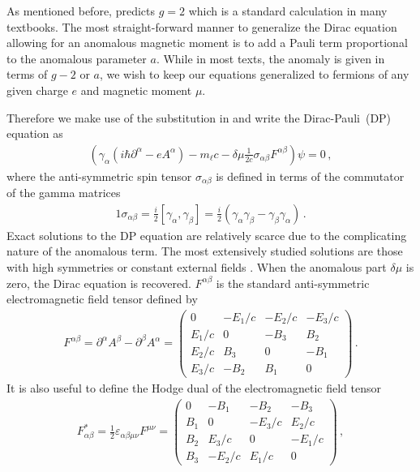 As mentioned before,  predicts $g=2$ which is a standard calculation in many textbooks. The most straight-forward manner to generalize the Dirac equation allowing for an anomalous magnetic moment is to add a Pauli term proportional to the anomalous parameter $a$. While in most texts, the anomaly is given in terms of $g-2$ or $a$, we wish to keep our equations generalized to fermions of any given charge $e$ and magnetic moment $\mu$. 

Therefore we make use of the substitution in  and write the Dirac-Pauli~(DP) equation as
\begin{gather}
	\label{dp:1}
    \left(\gamma_{\alpha}\left(i\hbar\partial^{\alpha} - eA^{\alpha}\right) - m_{\ell}c - \delta\mu\frac{1}{2c}\sigma_{\alpha\beta}F^{\alpha\beta}\right)\psi=0\,,
\end{gather}
where the anti-symmetric spin tensor $\sigma_{\alpha\beta}$ is defined in terms of the commutator of the gamma matrices
\begin{alignat}{1}
	\label{sigma:1} \sigma_{\alpha\beta}=\frac{i}{2}\left[\gamma_{\alpha},\gamma_{\beta}\right]=\frac{i}{2}\left(\gamma_{\alpha}\gamma_{\beta}-\gamma_{\beta}\gamma_{\alpha}\right)\,.
\end{alignat}
Exact solutions to the DP equation are relatively scarce due to the complicating nature of the anomalous term. The most extensively studied solutions are those with high symmetries or constant external fields \citep{Thaller:1992ji}. When the anomalous part $\delta\mu$ is zero, the Dirac equation is recovered. $F^{\alpha\beta}$ is the standard anti-symmetric electromagnetic field tensor defined by
\begin{gather}
    \label{em:1}
    F^{\alpha\beta} = \partial^{\alpha}A^{\beta} - \partial^{\beta}A^{\alpha} = 
    \begin{pmatrix}
        0        & -E_{1}/c  & -E_{2}/c  & -E_{3}/c\\
        E_{1}/c  & 0         & -B_{3}    & B_{2}\\
        E_{2}/c  & B_{3}     & 0         & -B_{1}\\
        E_{3}/c  & -B_{2}    & B_{1}     & 0
    \end{pmatrix}\,.
\end{gather}
It is also useful to define the Hodge dual of the electromagnetic field tensor
\begin{gather}
    \label{em:2}
    F_{\alpha\beta}^{*} = \frac{1}{2}\varepsilon_{\alpha\beta\mu\nu}F^{\mu\nu} = 
    \begin{pmatrix}
        0        & -B_{1}  & -B_{2}  & -B_{3}\\
        B_{1}  & 0         & -E_{3}/c    & E_{2}/c\\
        B_{2}  & E_{3}/c     & 0         & -E_{1}/c\\
        B_{3}  & -E_{2}/c    & E_{1}/c     & 0
    \end{pmatrix}\,,
\end{gather}

